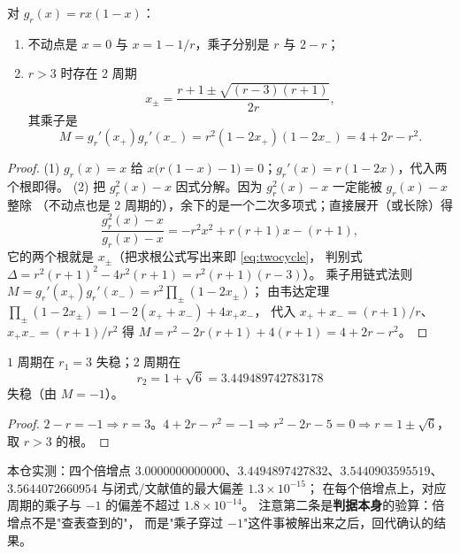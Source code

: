 \begin{theorem}
\label{thm:two-cycle}
对 $g_r(x)=rx(1-x)$：
\begin{enumerate}
  \item 不动点是 $x=0$ 与 $x=1-1/r$，乘子分别是 $r$ 与 $2-r$；
  \item $r>3$ 时存在 2 周期
        \begin{equation}
          x_\pm=\frac{r+1\pm\sqrt{(r-3)(r+1)}}{2r},
          \label{eq:twocycle}
        \end{equation}
        其乘子是
        \begin{equation}
          M=g_r'(x_+)g_r'(x_-)=r^2(1-2x_+)(1-2x_-)=4+2r-r^2 .
          \label{eq:twomult}
        \end{equation}
\end{enumerate}
\end{theorem}

\begin{proof}
(1) $g_r(x)=x$ 给 $x\bigl(r(1-x)-1\bigr)=0$；$g_r'(x)=r(1-2x)$，代入两个根即得。
(2) 把 $g_r^2(x)-x$ 因式分解。因为 $g_r^2(x)-x$ 一定能被 $g_r(x)-x$ 整除
（不动点也是 2 周期的），余下的是一个二次多项式；直接展开（或长除）得
\[
  \frac{g_r^2(x)-x}{g_r(x)-x}=-r^2x^2+r(r+1)x-(r+1),
\]
它的两个根就是 $x_\pm$（把求根公式写出来即 \eqref{eq:twocycle}，
判别式 $\Delta=r^2(r+1)^2-4r^2(r+1)=r^2(r+1)(r-3)$）。
乘子用链式法则 $M=g_r'(x_+)g_r'(x_-)=r^2\prod_\pm(1-2x_\pm)$；
由韦达定理 $\prod_\pm(1-2x_\pm)=1-2(x_++x_-)+4x_+x_-$，
代入 $x_++x_-=(r+1)/r$、$x_+x_-=(r+1)/r^2$ 得
$M=r^2-2r(r+1)+4(r+1)=4+2r-r^2$。
\end{proof}

\begin{theorem}[倍增点]
\label{thm:doubling}
$1$ 周期在 $r_1=3$ 失稳；2 周期在
\begin{equation}
  r_2=1+\sqrt6=3.449489742783178
  \label{eq:r2}
\end{equation}
失稳（由 $M=-1$）。
\end{theorem}

\begin{proof}
$2-r=-1\Rightarrow r=3$。$4+2r-r^2=-1\Rightarrow r^2-2r-5=0\Rightarrow r=1\pm\sqrt6$，
取 $r>3$ 的根。
\end{proof}

本仓实测：四个倍增点 $3.0000000000000$、$3.4494897427832$、$3.5440903595519$、
$3.5644072660954$ 与闭式/文献值的最大偏差 $1.3\times10^{-15}$；
在每个倍增点上，对应周期的乘子与 $-1$ 的偏差不超过 $1.8\times10^{-14}$。
注意第二条是\textbf{判据本身}的验算：倍增点不是"查表查到的"，
而是"乘子穿过 $-1$"这件事被解出来之后，回代确认的结果。

